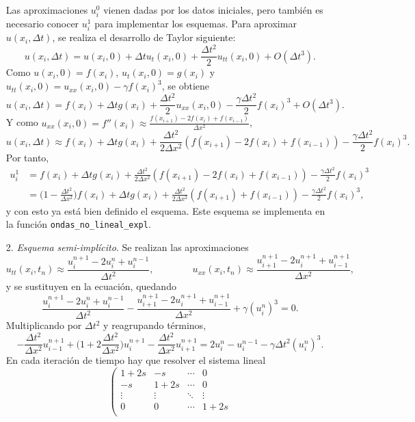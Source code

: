 \documentclass[a4paper, 11pt, oneside]{report}
\begin{document}
\begin{itemize}
    Las aproximaciones $u_i^0$ vienen dadas por los datos iniciales, pero también es necesario conocer $u_i^1$ para implementar los esquemas. Para aproximar $u(x_i, \Delta t)$, se realiza el desarrollo de Taylor siguiente:
    \[u(x_i,\Delta t) = u(x_i,0)+\Delta t u_t(x_i, 0) + \frac{\Delta t^2}{2}u_{tt}(x_i,0)+O(\Delta t^3).\]
    Como $u(x_i,0) = f(x_i)$, $u_t(x_i,0) = g(x_i)$ y $u_{tt}(x_i,0) = u_{xx}(x_i,0)-\gamma f(x_i)^3$, se obtiene
    \[u(x_i,\Delta t) = f(x_i)+\Delta t g(x_i) + \frac{\Delta t^2}{2}u_{xx}(x_i,0)-\frac{\gamma\Delta t^2}{2}f(x_i)^3+O(\Delta t^3).\]
    Y como $u_{xx}(x_i,0) = f''(x_i) \approx \frac{f(x_{i+1})-2f(x_i)+f(x_{i-1})}{\Delta x^2}$,
    \[u(x_i,\Delta t) \approx f(x_i)+\Delta t g(x_i) + \frac{\Delta t^2}{2\Delta x^2}(f(x_{i+1})-2f(x_i)+f(x_{i-1}))-\frac{\gamma\Delta t^2}{2}f(x_i)^3.\]
    Por tanto,
    \begin{align*}
        u_i^1 &= f(x_i)+\Delta t g(x_i) + \frac{\Delta t^2}{2\Delta x^2}(f(x_{i+1})-2f(x_i)+f(x_{i-1}))-\frac{\gamma\Delta t^2}{2}f(x_i)^3 \\
        &=\bigl(1-\frac{\Delta t^2}{\Delta x^2}\bigr)f(x_i) + \Delta t g(x_i) + \frac{\Delta t^2 }{2\Delta x^2}(f(x_{i+1})+f(x_{i-1}))-\frac{\gamma\Delta t^2}{2}f(x_i)^3,
    \end{align*}
    y con esto ya está bien definido el esquema. Este esquema se implementa en la función \texttt{ondas\_no\_lineal\_expl}.
    \item[2.] \emph{Esquema semi-implícito}. Se realizan las aproximaciones 
    \[u_{tt}(x_i,t_n) \approx \frac{u_i^{n+1}-2u_i^n + u_i^{n-1}}{\Delta t^2}, \qquad \qquad u_{xx}(x_i,t_n) \approx \frac{u_{i+1}^{n+1} - 2u_i^{n+1} + u_{i-1}^{n+1}}{\Delta x^2},\]
    y se sustituyen en la ecuación, quedando
    \[\frac{u_i^{n+1}-2u_i^n + u_i^{n-1}}{\Delta t^2}-\frac{u_{i+1}^{n+1} - 2u_i^{n+1} + u_{i-1}^{n+1}}{\Delta x^2}+\gamma (u_i^n)^3 = 0.\]
    Multiplicando por $\Delta t^2$ y reagrupando términos,
    \[-\frac{\Delta t^2}{\Delta x^2}u_{i-1}^{n+1}+\bigl(1+2\frac{\Delta t^2}{\Delta x^2}\bigr)u_i^{n+1} - \frac{\Delta t^2}{\Delta x^2}u_{i+1}^{n+1} = 2u_i^n - u_i^{n-1}-\gamma \Delta t^2(u_i^n)^3.\]
    En cada iteración de tiempo hay que resolver el sistema lineal
    \[\left(\begin{array}{cccc}
        1+2s & -s & \cdots &  0 \\
        -s & 1+2s & \cdots &  0 \\
        \vdots & \vdots & \ddots &  \vdots \\
        0 & 0 & \cdots & 1+2s \\

\end{array}\]
\end{itemize}
\end{document}
